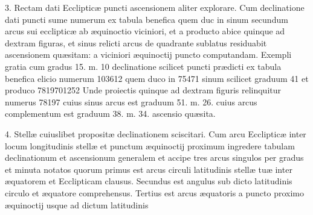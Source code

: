 \documentclass[11pt,a4paper]{article}
\begin{document}
3. Rectam dati Ecclipticæ puncti ascensionem aliter explorare. Cum declinatione dati puncti sume numerum ex tabula benefica quem duc in sinum secundum arcus sui ecclipticæ ab æquinoctio viciniori, et a producto abice quinque ad dextram figuras, et sinus relicti arcus de quadrante sublatus residuabit ascensionem quæsitam: a viciniori æquinoctij puncto computandam. Exempli gratia cum gradus 15. m. 10 declinatione scilicet puncti prædicti ex tabula benefica elicio numerum 103612 quem duco in 75471 sinum scilicet graduum 41 et produco 7819701252 Unde proiectis quinque ad dextram figuris relinquitur numerus 78197 cuius sinus arcus est graduum 51. m. 26. cuius arcus complementum est graduum 38. m. 34. ascensio quæsita.

4. Stellæ cuiuslibet propositæ declinationem sciscitari. Cum arcu Ecclipticæ inter locum longitudinis stellæ et punctum æquinoctij proximum ingredere tabulam declinationum et ascensionum generalem et accipe tres arcus singulos per gradus et minuta notatos quorum primus est arcus circuli latitudinis  stellæ tuæ inter æquatorem et Ecclipticam clausus. Secundus est angulus sub dicto latitudinis circulo et æquatore comprehensus. Tertius est arcus æquatoris a puncto proximo æquinoctij usque ad dictum latitudinis
\end{document}
